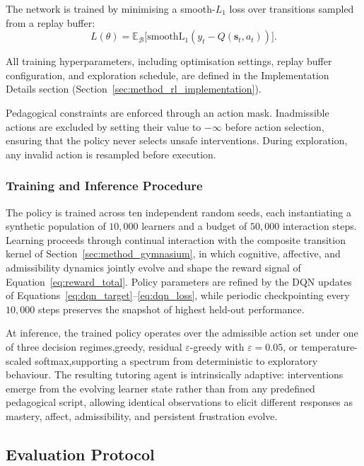 The network is trained by minimising a smooth-$L_1$ loss over transitions sampled from a replay buffer:
\begin{equation}
L(\theta) = \mathbb{E}_{\mathcal{B}} \bigl[\mathrm{smoothL_1}(y_t - Q(\mathbf{s}_t, a_t))\bigr].
\label{eq:dqn_loss}
\end{equation}

All training hyperparameters, including optimisation settings, replay buffer configuration, and exploration schedule, are defined in the Implementation Details section (Section~\ref{sec:method_rl_implementation}).

Pedagogical constraints are enforced through an action mask. Inadmissible actions are excluded by setting their value to $-\infty$ before action selection, ensuring that the policy never selects unsafe interventions. During exploration, any invalid action is resampled before execution.
\subsubsection{Training and Inference Procedure}\label{sec:method_rl_training}

The policy is trained across ten independent random seeds, each instantiating a synthetic population of $10{,}000$ learners and a budget of $50{,}000$ interaction steps. Learning proceeds through continual interaction with the composite transition kernel of Section~\ref{sec:method_gymnasium}, in which cognitive, affective, and admissibility dynamics jointly evolve and shape the reward signal of Equation~\eqref{eq:reward_total}. Policy parameters are refined by the \ac{DQN} updates of Equations~\eqref{eq:dqn_target}--\eqref{eq:dqn_loss}, while periodic checkpointing every $10{,}000$ steps preserves the snapshot of highest held-out performance.\label{sec:method_policy}

At inference, the trained policy operates over the admissible action set under one of three decision regimes,greedy, residual $\varepsilon$-greedy with $\varepsilon = 0.05$, or temperature-scaled softmax,supporting a spectrum from deterministic to exploratory behaviour. The resulting tutoring agent is intrinsically adaptive: interventions emerge from the evolving learner state rather than from any predefined pedagogical script, allowing identical observations to elicit different responses as mastery, affect, admissibility, and persistent frustration evolve.
\subsection{Evaluation Protocol}\label{sec:method_rl_eval_parent}

